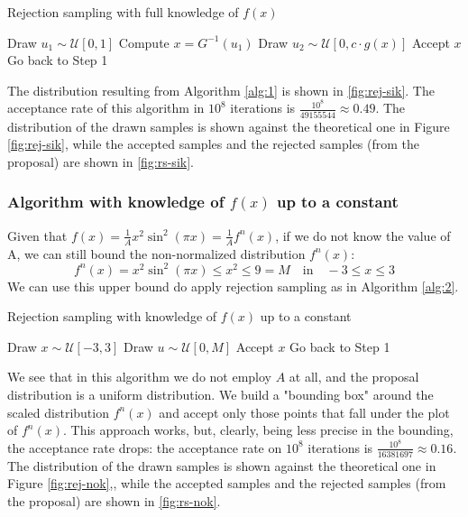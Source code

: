 \documentclass[a4paper,12pt]{article}
\begin{document}
\begin{algorithm}
\caption{Rejection sampling with full knowledge of $f(x)$}
\label{alg:1}
\begin{algorithmic}[1]
\STATE Draw $u_1 \sim \mathcal{U}[0,1]$
\STATE Compute $x = G^{-1}(u_1)$
\STATE Draw $u_2 \sim \mathcal{U}[0, c \cdot g(x)]$
    \STATE Accept $x$
\ELSE
    \STATE Go back to Step 1
\ENDIF
\end{algorithmic}
\end{algorithm}

The distribution resulting from Algorithm \ref{alg:1} is shown in \ref{fig:rej-sik}. The acceptance rate of this algorithm in $10^8$ iterations is $\frac{10^8}{49155544} \approx 0.49$. The distribution of the drawn samples is shown against the theoretical one in Figure \ref{fig:rej-sik}, while the accepted samples and the rejected samples (from the proposal) are shown in \ref{fig:rs-sik}.

\subsubsection*{Algorithm with knowledge of $f(x)$ up to a constant}
Given that $f(x) = \frac{1}{A}x^2\sin^2(\pi x)=\frac{1}{A}f^n(x)$, if we do not know the value of A, we can still bound the non-normalized distribution $f^{n}(x)$:
\begin{equation}
    f^n(x) = x^2\sin^2(\pi x) \leq x^2 \leq 9 = M\quad \text{in}\quad -3\leq x\leq3 
\end{equation}
We can use this upper bound do apply rejection sampling as in Algorithm \ref{alg:2}.

\begin{algorithm}
\caption{Rejection sampling with knowledge of $f(x)$ up to a constant}
\label{alg:2}
\begin{algorithmic}[1]
\STATE Draw $x \sim \mathcal{U}[-3,3]$
\STATE Draw $u \sim \mathcal{U}[0, M]$
    \STATE Accept $x$
\ELSE
    \STATE Go back to Step 1
\ENDIF
\end{algorithmic}
\end{algorithm}


We see that in this algorithm we do not employ $A$ at all, and the proposal distribution is a uniform distribution. We build a "bounding box" around the scaled distribution $f^n(x)$ and accept only those points that fall under the plot of $f^n(x)$. This approach works, but, clearly, being less precise in the bounding, the acceptance rate drops: the acceptance rate on $10^8$ iterations is $\frac{10^8}{16381697} \approx 0.16$. The distribution of the drawn samples is shown against the theoretical one in Figure \ref{fig:rej-nok},, while the accepted samples and the rejected samples (from the proposal) are shown in \ref{fig:rs-nok}.
\end{document}
